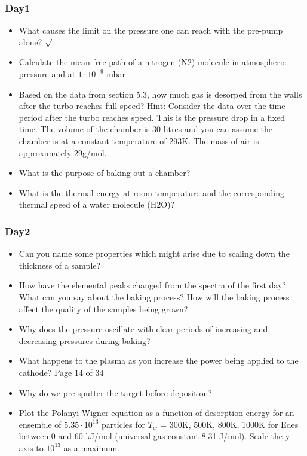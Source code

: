 \documentclass[]{article}
\begin{document}
\subsubsection{Day1}
\begin{itemize}  
	\item What causes the limit on the pressure one can reach with the pre-pump alone? $\surd$
	\item  Calculate the mean free path of a nitrogen (N2) molecule in atmospheric pressure and at $1 \cdot 10^{−9}$ mbar 
	\item Based on the data from section 5.3, how much gas is desorped from the walls after the turbo reaches full speed? Hint: Consider the data over the time period after the turbo reaches speed. This is the pressure drop in a ﬁxed time. The volume of the chamber is 30 litres and you can assume the chamber is at a constant temperature of 293K. The mass of air is approximately 29g/mol.
	 

	\item What is the purpose of baking out a chamber? 
	\item What is the thermal energy at room temperature and the corresponding thermal speed of a water molecule (H2O)?
\end{itemize}
\subsubsection{Day2}
\begin{itemize}
	 \item Can you name some properties which might arise due to scaling down the thickness of a sample? \item How have the elemental peaks changed from the spectra of the ﬁrst day? What can you say about the baking process? How will the baking process affect the quality of the samples being grown? \item Why does the pressure oscillate with clear periods of increasing and decreasing pressures during baking? \item What happens to the plasma as you increase the power being applied to the cathode?
	Page 14 of 34
	\item Why do we pre-sputter the target before deposition? \item  Plot the Polanyi-Wigner equation as a function of desorption energy for an ensemble of $5.35 \cdot 10^{13}$ particles for $T_w$ = 300K, 500K, 800K, 1000K for Edes between 0 and 60 kJ/mol (universal gas constant 8.31 J/mol). Scale the y-axis to $10^{13}$ as a maximum.
	
\end{itemize}
\end{document}
